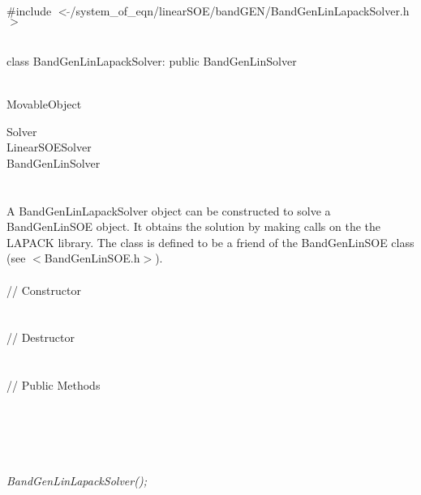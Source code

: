 
   \\
\#include $<\tilde{ }$/system\_of\_eqn/linearSOE/bandGEN/BandGenLinLapackSolver.h$>$  


  \\
class BandGenLinLapackSolver: public BandGenLinSolver  


 \\
MovableObject 

\indent\indent  Solver \\
\indent\indent\indent LinearSOESolver \\
\indent\indent\indent\indent BandGenLinSolver \\
\indent\indent\indent\indent{} \\

  \\
\indent A BandGenLinLapackSolver object can be constructed to solve
a BandGenLinSOE object. It obtains the solution by making calls on the
the LAPACK library. The class is defined to be a friend of the 
BandGenLinSOE class (see $<$BandGenLinSOE.h$>$). \\


  \\
\indent\indent // Constructor \\
\indent{}  \\ \\
\indent\indent // Destructor \\
\indent{}\\  \\
\indent\indent // Public Methods \\
\indent{} \\
\indent{} \\
\indent{} \\ 
\indent{} \\ 


  \\
{\em BandGenLinLapackSolver();}  

